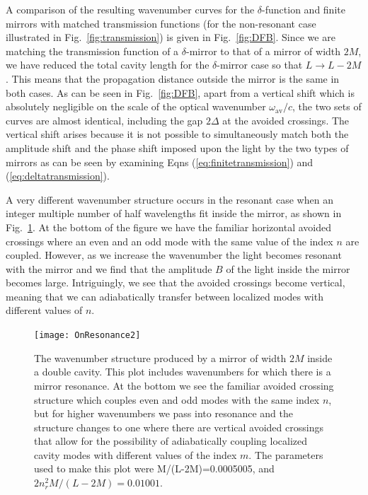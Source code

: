 \documentclass[twocolumn,english,pra,aps,superscriptaddress,floatfix]{revtex4-1}
\begin{document}
A comparison of the resulting wavenumber curves for the $\delta$-function and finite mirrors with matched transmission functions (for the non-resonant case illustrated in Fig.\ \ref{fig:transmission}) is given in Fig.\ \ref{fig:DFB}. Since we are matching the transmission function of a $\delta$-mirror to that of a mirror of width $2M$, we have reduced the total cavity length for the $\delta$-mirror case so that $L \rightarrow L-2M$. This means that the propagation distance outside the mirror is the same in both cases. As can be seen in Fig.\ \ref{fig:DFB}, apart from a vertical shift which is absolutely negligible on the scale of the optical wavenumber $\omega_{\mathrm{av}}/c$, the two sets of curves are almost identical, including the gap $2\Delta$ at the avoided crossings. The vertical shift arises because it is not possible to simultaneously match both the amplitude shift and the phase shift imposed upon the light by the two types of mirrors as can be seen by examining Eqns (\ref{eq:finitetransmission}) and (\ref{eq:deltatransmission}). 


A very different wavenumber structure occurs in the resonant case when an integer multiple number of half wavelengths fit inside the mirror, as shown in Fig.\ \ref{fig:OnResonance}. At the bottom of the figure we have the familiar horizontal avoided crossings where an even and an odd mode with the same value of the index $n$ are coupled. However, as we increase the wavenumber the light becomes resonant with the mirror and we find that the amplitude $B$ of the light inside the mirror becomes large.  Intriguingly, we see that the avoided crossings become vertical, meaning that we can adiabatically transfer between localized modes with different values of $n$. 





\begin{figure}
\texttt{[image: OnResonance2]}
\caption{The wavenumber structure produced by a mirror of width $2M$ inside a double cavity. This plot includes wavenumbers for which there is a mirror resonance. At the bottom we see the familiar avoided crossing structure which couples even and odd modes with the same index $n$, but for higher wavenumbers we pass into resonance and the structure changes to one where there are vertical avoided crossings that allow for the possibility of adiabatically coupling localized cavity modes with different values of the index $m$. The parameters used to make this plot were M/(L-2M)=0.0005005, and $2 n_{r}^2 M/(L-2M)=0.01001$.}
\label{fig:OnResonance}
\end{figure}
\end{document}
